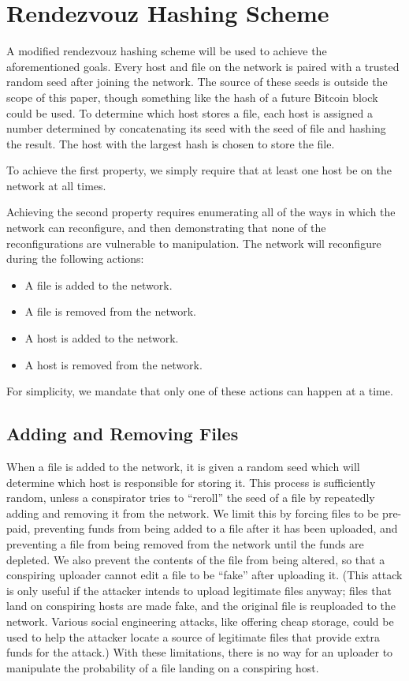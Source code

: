 \documentclass[twocolumn]{article}
\begin{document}
\section{Rendezvouz Hashing Scheme}
A modified rendezvouz hashing scheme will be used to achieve the aforementioned goals.
Every host and file on the network is paired with a trusted random seed after joining the network.
The source of these seeds is outside the scope of this paper, though something like the hash of a future Bitcoin block could be used.
To determine which host stores a file, each host is assigned a number determined by concatenating its seed with the seed of file and hashing the result.
The host with the largest hash is chosen to store the file.

To achieve the first property, we simply require that at least one host be on the network at all times.

Achieving the second property requires enumerating all of the ways in which the network can reconfigure, and then demonstrating that none of the reconfigurations are vulnerable to manipulation.
The network will reconfigure during the following actions:
\begin{itemize}
	\item A file is added to the network.
	\item A file is removed from the network.
	\item A host is added to the network.
	\item A host is removed from the network.
\end{itemize}
For simplicity, we mandate that only one of these actions can happen at a time.

\subsection{Adding and Removing Files}
When a file is added to the network, it is given a random seed which will determine which host is responsible for storing it.
This process is sufficiently random, unless a conspirator tries to ``reroll'' the seed of a file by repeatedly adding and removing it from the network.
We limit this by forcing files to be pre-paid, preventing funds from being added to a file after it has been uploaded, and preventing a file from being removed from the network until the funds are depleted.
We also prevent the contents of the file from being altered, so that a conspiring uploader cannot edit a file to be ``fake'' after uploading it.
(This attack is only useful if the attacker intends to upload legitimate files anyway; files that land on conspiring hosts are made fake, and the original file is reuploaded to the network. Various social engineering attacks, like offering cheap storage, could be used to help the attacker locate a source of legitimate files that provide extra funds for the attack.)
With these limitations, there is no way for an uploader to manipulate the probability of a file landing on a conspiring host.
\end{document}

